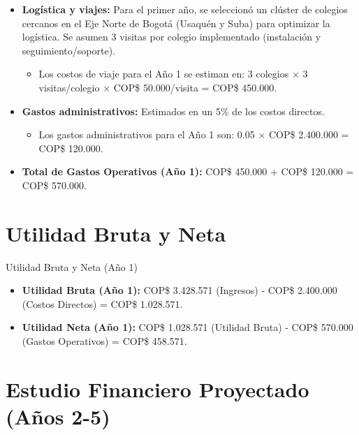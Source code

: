 \begin{frame}
  \begin{itemize}
    \item \textbf{Logística y viajes:} Para el primer año, se seleccionó un
      clúster de colegios cercanos en el Eje Norte de Bogotá
      (Usaquén y Suba) para optimizar la logística. Se asumen 3 visitas por
      colegio implementado (instalación y seguimiento/soporte).
      \begin{itemize}
        \item Los costos de viaje para el Año 1 se estiman en:
          3 colegios $\times$ 3 visitas/colegio $\times$
          COP\$ 50.000/visita = COP\$ 450.000.
      \end{itemize}
    \item \textbf{Gastos administrativos:} Estimados en un 5\% de los
      costos directos.
      \begin{itemize}
        \item Los gastos administrativos para el Año 1 son: 0.05 $\times$
          COP\$ 2.400.000 = COP\$ 120.000.
      \end{itemize}
    \item \textbf{Total de Gastos Operativos (Año 1):} COP\$ 450.000 +
      COP\$ 120.000 = COP\$ 570.000.
  \end{itemize}
\end{frame}

\section{Utilidad Bruta y Neta}

\begin{frame}{Utilidad Bruta y Neta (Año 1)}
  \begin{itemize}
    \item \textbf{Utilidad Bruta (Año 1):} COP\$ 3.428.571 (Ingresos) -
      COP\$ 2.400.000 (Costos Directos) = COP\$ 1.028.571.
    \item \textbf{Utilidad Neta (Año 1):} COP\$ 1.028.571 (Utilidad Bruta)
      - COP\$ 570.000 (Gastos Operativos) = COP\$ 458.571.
  \end{itemize}
\end{frame}

\section{Estudio Financiero Proyectado (Años 2-5)}

